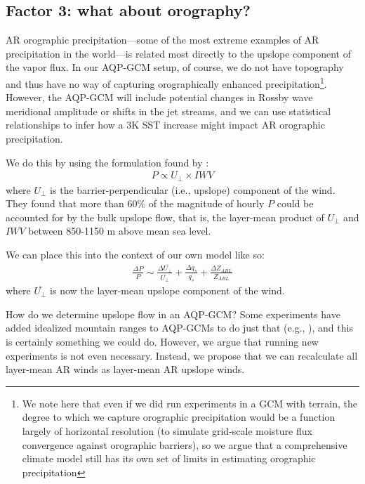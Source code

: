 \documentclass[letterpaper,12pt]{article}
\begin{document}
\subsection{Factor 3: what about orography?}

AR orographic precipitation---some of the most extreme examples of AR precipitation in the world---is related most directly to the upslope component of the vapor flux. In our AQP-GCM setup, of course, we do not have topography and thus have no way of capturing orographically enhanced precipitation\footnote{We note here that even if we did run experiments in a GCM with terrain, the degree to which we capture orographic precipitation would be a function largely of horizontal resolution (to simulate grid-scale moisture flux convergence against orographic barriers), so we argue that a comprehensive climate model still has its own set of limits in estimating orographic precipitation}. However, the AQP-GCM will include potential changes in Rossby wave meridional amplitude or shifts in the jet streams, and we can use statistical relationships to infer how a 3K SST increase might impact AR orographic precipitation. 

We do this by using the formulation found by \cite{Cordeira2013The2010}:
\begin{align}\label{eq:UpslopeFlows}
    P \propto U_\bot \times IWV
\end{align}
where $U_\bot$ is the barrier-perpendicular (i.e., upslope) component of the wind. They found that more than 60\% of the magnitude of hourly $P$ could be accounted for by the bulk upslope flow, that is, the layer-mean product of $U_\bot$ and $IWV$ between 850-1150 m above mean sea level.

We can place this into the context of our own model like so: \begin{align}
    \frac{\Delta P}P \sim \frac{\Delta \overline{U_\bot}}{\overline{U_\bot}} + \frac{\Delta q_s}{q_s} + \frac{\Delta Z_{ABL}}{Z_{ABL}}
\end{align}
where $\overline{U_\bot}$ is now the layer-mean upslope component of the wind. 

How do we determine upslope flow in an AQP-GCM? Some experiments have added idealized mountain ranges to AQP-GCMs to do just that (e.g., \cite{Shi2014Thesub2/sub}), and this is certainly something we could do. However, we argue that running new experiments is not even necessary. Instead, we propose that we can recalculate all layer-mean AR winds as layer-mean AR upslope winds. 
\end{document}
